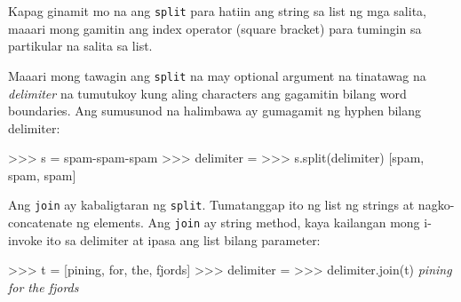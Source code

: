 \documentclass[10pt,]{book}
\newenvironment{Shaded}{}{}
\newcommand{\CommentTok}[1]{\textcolor[rgb]{0.38,0.63,0.69}{\textit{#1}}}
\newcommand{\NormalTok}[1]{#1}
\newcommand{\OperatorTok}[1]{\textcolor[rgb]{0.40,0.40,0.40}{#1}}
\newcommand{\StringTok}[1]{\textcolor[rgb]{0.25,0.44,0.63}{#1}}
\begin{document}
Kapag ginamit mo na ang \texttt{split} para hatiin ang string sa list ng
mga salita, maaari mong gamitin ang index operator (square bracket) para
tumingin sa partikular na salita sa list.

Maaari mong tawagin ang \texttt{split} na may optional argument na
tinatawag na \emph{delimiter} na tumutukoy kung aling characters ang
gagamitin bilang word boundaries. Ang sumusunod na halimbawa ay
gumagamit ng hyphen bilang delimiter:

  

\begin{Shaded}
\begin{Highlighting}[]
\OperatorTok{\textgreater{}\textgreater{}\textgreater{}}\NormalTok{ s }\OperatorTok{=} \StringTok{\textquotesingle{}spam{-}spam{-}spam\textquotesingle{}}
\OperatorTok{\textgreater{}\textgreater{}\textgreater{}}\NormalTok{ delimiter }\OperatorTok{=} \StringTok{\textquotesingle{}{-}\textquotesingle{}}
\OperatorTok{\textgreater{}\textgreater{}\textgreater{}}\NormalTok{ s.split(delimiter)}
\NormalTok{[}\StringTok{\textquotesingle{}spam\textquotesingle{}}\NormalTok{, }\StringTok{\textquotesingle{}spam\textquotesingle{}}\NormalTok{, }\StringTok{\textquotesingle{}spam\textquotesingle{}}\NormalTok{]}
\end{Highlighting}
\end{Shaded}

Ang \texttt{join} ay kabaligtaran ng \texttt{split}. Tumatanggap ito ng
list ng strings at nagko-concatenate ng elements. Ang \texttt{join} ay
string method, kaya kailangan mong i-invoke ito sa delimiter at ipasa
ang list bilang parameter:

  

\begin{Shaded}
\begin{Highlighting}[]
\OperatorTok{\textgreater{}\textgreater{}\textgreater{}}\NormalTok{ t }\OperatorTok{=}\NormalTok{ [}\StringTok{\textquotesingle{}pining\textquotesingle{}}\NormalTok{, }\StringTok{\textquotesingle{}for\textquotesingle{}}\NormalTok{, }\StringTok{\textquotesingle{}the\textquotesingle{}}\NormalTok{, }\StringTok{\textquotesingle{}fjords\textquotesingle{}}\NormalTok{]}
\OperatorTok{\textgreater{}\textgreater{}\textgreater{}}\NormalTok{ delimiter }\OperatorTok{=} \StringTok{\textquotesingle{} \textquotesingle{}}
\OperatorTok{\textgreater{}\textgreater{}\textgreater{}}\NormalTok{ delimiter.join(t)}
\CommentTok{\textquotesingle{}pining for the fjords\textquotesingle{}}
\end{Highlighting}
\end{Shaded}
\end{document}
